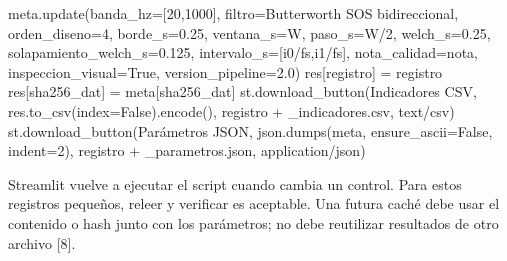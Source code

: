 \documentclass[
  spanish,
  10.5pt,
  a4paper,
  DIV=11,
  numbers=noendperiod]{scrartcl}
\newenvironment{Shaded}{\begin{snugshade}}{\end{snugshade}}
\newcommand{\DecValTok}[1]{\textcolor[rgb]{0.68,0.00,0.00}{#1}}
\newcommand{\FloatTok}[1]{\textcolor[rgb]{0.68,0.00,0.00}{#1}}
\newcommand{\NormalTok}[1]{\textcolor[rgb]{0.00,0.23,0.31}{#1}}
\newcommand{\OperatorTok}[1]{\textcolor[rgb]{0.37,0.37,0.37}{#1}}
\newcommand{\StringTok}[1]{\textcolor[rgb]{0.13,0.47,0.30}{#1}}
\newcommand{\VariableTok}[1]{\textcolor[rgb]{0.07,0.07,0.07}{#1}}
\begin{document}
\begin{Shaded}
\begin{Highlighting}[]
\NormalTok{meta.update(banda\_hz}\OperatorTok{=}\NormalTok{[}\DecValTok{20}\NormalTok{,}\DecValTok{1000}\NormalTok{], filtro}\OperatorTok{=}\StringTok{\textquotesingle{}Butterworth SOS bidireccional\textquotesingle{}}\NormalTok{,}
\NormalTok{            orden\_diseno}\OperatorTok{=}\DecValTok{4}\NormalTok{, borde\_s}\OperatorTok{=}\FloatTok{0.25}\NormalTok{, ventana\_s}\OperatorTok{=}\NormalTok{W, paso\_s}\OperatorTok{=}\NormalTok{W}\OperatorTok{/}\DecValTok{2}\NormalTok{,}
\NormalTok{            welch\_s}\OperatorTok{=}\FloatTok{0.25}\NormalTok{, solapamiento\_welch\_s}\OperatorTok{=}\FloatTok{0.125}\NormalTok{,}
\NormalTok{            intervalo\_s}\OperatorTok{=}\NormalTok{[i0}\OperatorTok{/}\NormalTok{fs,i1}\OperatorTok{/}\NormalTok{fs], nota\_calidad}\OperatorTok{=}\NormalTok{nota,}
\NormalTok{            inspeccion\_visual}\OperatorTok{=}\VariableTok{True}\NormalTok{, version\_pipeline}\OperatorTok{=}\StringTok{\textquotesingle{}2.0\textquotesingle{}}\NormalTok{)}
\NormalTok{res[}\StringTok{\textquotesingle{}registro\textquotesingle{}}\NormalTok{] }\OperatorTok{=}\NormalTok{ registro}
\NormalTok{res[}\StringTok{\textquotesingle{}sha256\_dat\textquotesingle{}}\NormalTok{] }\OperatorTok{=}\NormalTok{ meta[}\StringTok{\textquotesingle{}sha256\_dat\textquotesingle{}}\NormalTok{]}
\NormalTok{st.download\_button(}\StringTok{\textquotesingle{}Indicadores CSV\textquotesingle{}}\NormalTok{, res.to\_csv(index}\OperatorTok{=}\VariableTok{False}\NormalTok{).encode(),}
\NormalTok{                   registro }\OperatorTok{+} \StringTok{\textquotesingle{}\_indicadores.csv\textquotesingle{}}\NormalTok{, }\StringTok{\textquotesingle{}text/csv\textquotesingle{}}\NormalTok{)}
\NormalTok{st.download\_button(}\StringTok{\textquotesingle{}Parámetros JSON\textquotesingle{}}\NormalTok{,}
\NormalTok{                   json.dumps(meta, ensure\_ascii}\OperatorTok{=}\VariableTok{False}\NormalTok{, indent}\OperatorTok{=}\DecValTok{2}\NormalTok{),}
\NormalTok{                   registro }\OperatorTok{+} \StringTok{\textquotesingle{}\_parametros.json\textquotesingle{}}\NormalTok{, }\StringTok{\textquotesingle{}application/json\textquotesingle{}}\NormalTok{)}
\end{Highlighting}
\end{Shaded}

Streamlit vuelve a ejecutar el script cuando cambia un control. Para
estos registros pequeños, releer y verificar es aceptable. Una futura
caché debe usar el contenido o hash junto con los parámetros; no debe
reutilizar resultados de otro archivo {[}8{]}.
\end{document}
